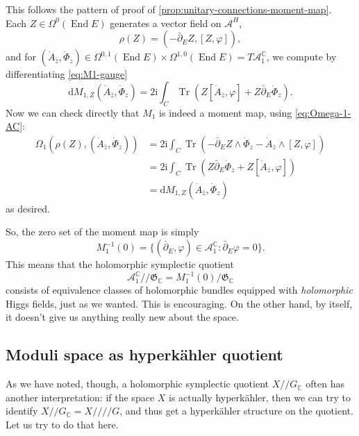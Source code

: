 \documentclass[12pt,letterpaper,reqno]{article}
\numberwithin{equation}{section}
\newcommand{\fG}{{\mathfrak G}}
\newcommand{\cA}{\ensuremath{\mathcal A}}
\newcommand{\C}{\ensuremath{\mathbb C}}
\newcommand{\kq}{/\!\!/}
\newcommand{\hk}{hyperk\"ahler\xspace}
\newcommand{\hkq}{/\!\!/\!\!/\!\!/}
\newcommand{\I}{{\mathrm i}}
\newcommand{\de}{\mathrm{d}}
\newcommand{\ti}[1]{\textit{#1}}
\DeclareMathOperator{\Tr}{Tr}
\DeclareMathOperator{\End}{End}
\begin{document}
\begin{pf} This follows the pattern of proof of \autoref{prop:unitary-connections-moment-map}.
Each $Z \in \Omega^0(\End E)$ generates a vector field on $\cA^H$,
\begin{equation}
  \rho(Z) = (- \bar\partial_E Z, [Z,\varphi]),
\end{equation}
and for
$(\dot A_{\bar z},\dot\Phi_z) \in \Omega^{0,1}(\End E) \times \Omega^{1,0}(\End E) = T\cA_1^\C$,
we compute by differentiating \eqref{eq:M1-gauge}
\begin{equation}
  \de M_{1,Z} (\dot A_{\bar z},\dot\Phi_z) = 2 \I \int_C \Tr( Z [\dot A_{\bar z},\varphi] + Z \bar\partial_E \dot\Phi_z).
\end{equation}
Now we can check directly that $M_1$ is indeed a moment map, using \eqref{eq:Omega-1-AC}:
\begin{align}
  \Omega_1(\rho(Z), (\dot A_{\bar z},\dot\Phi_z)) &= 2 \I \int_C \Tr(- \bar\partial_E Z \wedge \dot\Phi_z - \dot A_{\bar z} \wedge [Z,\varphi]) \\
  &= 2 \I \int_C \Tr(Z \bar\partial_E \dot\Phi_z + Z[\dot A_{\bar z},\varphi]) \\
  &= \de M_{1,Z}(\dot A_{\bar z},\dot\Phi_z)
\end{align}
as desired.
\end{pf}

So, the zero set of the moment map is simply
\begin{equation}
	M_1^{-1}(0) = \{ (\bar\partial_E, \varphi ) \in \cA^\C_1: \bar\partial_E \varphi = 0 \}.
\end{equation}
This means that
the holomorphic symplectic quotient
\begin{equation}
 \cA^\C_1 \kq \fG_\C = M_1^{-1}(0) / \fG_\C
\end{equation}
consists of equivalence classes of holomorphic bundles equipped
with \ti{holomorphic} Higgs fields, just as we wanted.
This is encouraging. On the other hand, by itself, it doesn't
give us anything really new about the space.


\subsection{Moduli space as \hk quotient}

As we have noted, though, a holomorphic symplectic quotient $X \kq G_\C$ 
often has another interpretation: if the space $X$ is 
actually \hk, then we can try to identify $X \kq G_\C = X \hkq G$,
and thus get a \hk structure on the quotient.
Let us try to do that here.
\end{document}
